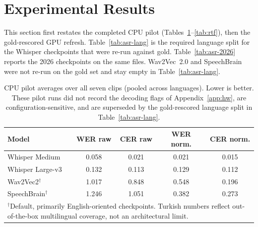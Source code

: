 \documentclass[conference]{IEEEtran}
\begin{document}
\section{Experimental Results}
\label{sec:results}

This section first restates the completed CPU pilot (Tables~\ref{tab:asr}--\ref{tab:rtf}), then the gold-rescored GPU refresh. Table~\ref{tab:asr-lang} is the required language split for the Whisper checkpoints that were re-run against gold. Table~\ref{tab:asr-2026} reports the 2026 checkpoints on the same files. Wav2Vec~2.0 and SpeechBrain were not re-run on the gold set and stay empty in Table~\ref{tab:asr-lang}.

\begin{table}[t]
\caption{CPU pilot averages over all seven clips (pooled across languages). Lower is better. These pilot runs did not record the decoding flags of Appendix~\ref{app:hw}, are configuration-sensitive, and are superseded by the gold-rescored language split in Table~\ref{tab:asr-lang}.}
\label{tab:asr}
\centering
\renewcommand{\arraystretch}{1.15}
\begin{tabular}{lcccc}
\toprule
\textbf{Model} & \textbf{WER raw} & \textbf{CER raw} & \textbf{WER norm.} & \textbf{CER norm.} \\
\midrule
Whisper Medium & 0.058 & 0.021 & 0.021 & 0.015 \\
Whisper Large-v3 & 0.132 & 0.113 & 0.129 & 0.112 \\
Wav2Vec2$^{\dagger}$ & 1.017 & 0.848 & 0.548 & 0.196 \\
SpeechBrain$^{\dagger}$ & 1.246 & 1.051 & 0.382 & 0.273 \\
\bottomrule
\multicolumn{5}{p{0.95\columnwidth}}{\footnotesize $^{\dagger}$Default, primarily English-oriented checkpoints. Turkish numbers reflect out-of-the-box multilingual coverage, not an architectural limit.}
\end{tabular}
\end{table}



\end{document}
